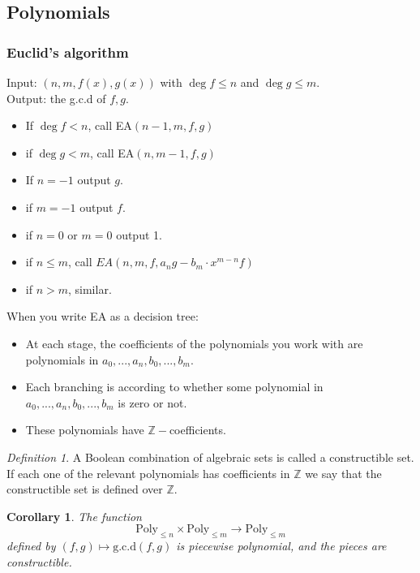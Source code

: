\documentclass[12pt]{article}
\newtheorem{corollary}[theorem]{Corollary}
\theoremstyle{remark}
\newtheorem{definition}[theorem]{Definition}
\newcommand{\Z}{\mathbb{Z}}
\begin{document}
\subsection{Polynomials}

\subsubsection{Euclid's algorithm}
 Input: $(n,m, f(x), g(x))$ with $\deg f \leq n $ and $\deg g \leq m$.\\
 Output: the g.c.d of $f,g$. \\
 
 \begin{itemize}
\item If $\deg f < n$, call EA$(n-1,m,f,g)$
\item if $\deg g < m $, call EA$(n, m-1, f, g)$
\item If $n=-1$ output $g$.
\item if $m = -1$ output $f$.
\item if $n=0$ or $m=0$ output 1.
\item if $n \leq m$, call $EA(n,m, f, a_ng-b_m \cdot x^{m-n}f)$ 
\item if $n >m$, similar.
 \end{itemize}


When you write EA as a decision tree: 
\begin{itemize}
\item At each stage, the coefficients of the polynomials you work with are polynomials in $a_0, ..., a_n, b_0, ..., b_m$.
\item Each branching is according to whether some polynomial in $a_0,...,a_n,b_0,...,b_m$ is zero or not.
\item These polynomials have $\Z-$coefficients.
\end{itemize}


\begin{definition}
A Boolean combination of algebraic sets is called a constructible set. If each one of the relevant polynomials has coefficients in $\Z$ we say that the constructible set is defined over $\Z$.
\end{definition}

\begin{corollary}
The function $$\text{Poly}_{\leq n} \times \text{Poly}_{\leq m} \rightarrow \text{Poly}_{\leq m} $$
defined by $(f,g) \mapsto \text{g.c.d}(f,g)$ is piecewise polynomial, and the pieces are constructible.
\end{corollary}
\end{document}
